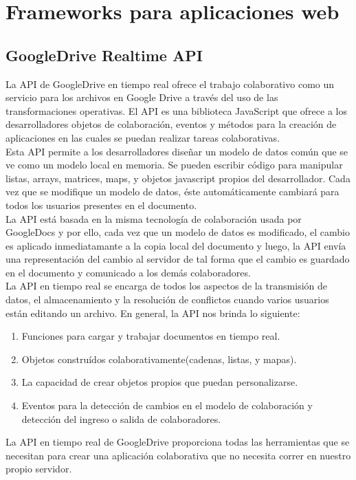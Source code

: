 \newpage
\section{Frameworks para aplicaciones web}

\subsection{GoogleDrive Realtime API}

La API de GoogleDrive en tiempo real ofrece el trabajo colaborativo como un servicio para los archivos en Google Drive a través del uso de las transformaciones operativas. El API es una biblioteca JavaScript que ofrece a los desarrolladores objetos de colaboración, eventos y métodos para la creación de aplicaciones en las cuales se puedan realizar tareas colaborativas.\\

Esta API permite a los desarrolladores diseñar un modelo de datos común que se ve como un modelo local en memoria. Se pueden escribir código para manipular listas, arrays, matrices, maps, y objetos javascript propios del desarrollador. Cada vez que se modifique un modelo de datos, éste automáticamente cambiará para todos los usuarios presentes en el documento.\\

La API está basada en la misma tecnología de colaboración usada por GoogleDocs y por ello, cada vez que un modelo de datos es modificado, el cambio es aplicado inmediatamante a la copia local del documento y luego, la API envía una representación del cambio al servidor de tal forma que el cambio es guardado en el documento y comunicado a los demás colaboradores.\\

La API en tiempo real se encarga de todos los aspectos de la transmisión de datos, el almacenamiento y la resolución de conflictos cuando varios usuarios están editando un archivo. En general, la API nos brinda lo siguiente:

\begin{enumerate}
  \item Funciones para cargar y trabajar documentos en tiempo real.
  \item Objetos construídos colaborativamente(cadenas, listas, y mapas).
  \item La capacidad de crear objetos propios que puedan personalizarse.
  \item Eventos para la detección de cambios en el modelo de colaboración y detección del ingreso o salida de colaboradores.
\end{enumerate}
La API en tiempo real de GoogleDrive proporciona todas las herramientas que se necesitan para crear una aplicación colaborativa que no necesita correr en nuestro propio servidor.


